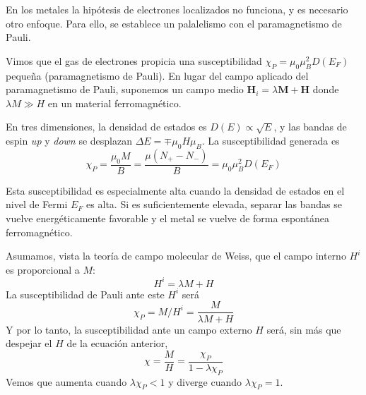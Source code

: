 \documentclass{tufte-book}
\newcommand{\sub}[1]{_{{\scriptscriptstyle\mathit{#1}}}}
\newcommand{\mb}{μ\sub{B}}
\begin{document}
En los metales la hipótesis de electrones localizados no funciona, y
es necesario otro enfoque. Para ello, se establece un palalelismo con
el paramagnetismo de Pauli.

Vimos que el gas de electrones propicia una susceptibilidad $χ\sub{P}
= μ_0 \mb^2 D(E\sub{F})$ pequeña (paramagnetismo de Pauli).
En lugar del campo aplicado del paramagnetismo de Pauli, suponemos un
campo medio $\symbf{H}_i = λ \symbf{M} + \symbf{H}$ donde $λM ≫ H$
en un material ferromagnético.


En tres dimensiones, la densidad de estados es $D(E) ∝ \sqrt E$, y las
bandas de espin \textit{up} y \textit{down} se desplazan $ΔE = \mp μ_0 H
\mb$. La susceptibilidad generada es
\begin{equation}
  χ\sub{P} = \frac{μ_0M}{B} = \frac{μ(N_+ - N_- )}{B} = μ_0 \mb ^2 D(E\sub{F})
\end{equation}

Esta susceptibilidad es especialmente alta cuando la densidad de
estados en el nivel de Fermi $E\sub{F}$ es alta. Si es suficientemente
elevada, separar las bandas se vuelve energéticamente favorable y el
metal se vuelve de forma espontánea ferromagnético.

Asumamos, vista la teoría de campo molecular de Weiss, que el campo
interno $H^i$ es proporcional a $M$:
\begin{equation}
  H^i = λM + H
\end{equation}
La susceptibilidad de Pauli ante este $H^i$ será
\begin{equation}
  χ\sub{P} = M/H^i = \frac{M}{λM+H}
\end{equation}
Y por lo tanto, la susceptibilidad ante un campo externo $H$ será, sin
más que despejar el $H$ de la ecuación anterior,
\begin{equation}
  χ = \frac{M}{H} = \frac{χ\sub{P}}{1-λχ\sub{P}}
\end{equation}
Vemos que aumenta cuando $λχ\sub{P}<1$ y diverge cuando $λχ\sub{P}=1$.
\end{document}
